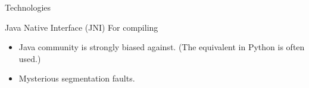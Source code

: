 \documentclass{beamer}
\begin{document}
\begin{frame}{Technologies}
\begin{block}{Java Native Interface (JNI)}
For compiling 
\begin{itemize}
\item Java community is strongly biased against. (The equivalent in Python is often used.)
\item Mysterious segmentation faults.
\end{itemize}
\end{block}
\end{frame}

\end{document}
